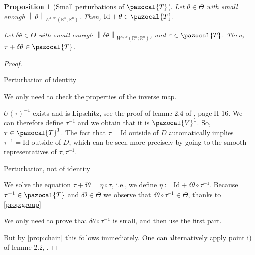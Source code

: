 \documentclass[english,a4paper,12pt,oneside]{scrbook}
\theoremstyle{break}
\newtheorem{prop}[equation]{Proposition}
\newenvironment{mproof}[1][\proofname]{%
  \begin{proof}[#1]$ $\par\nobreak\ignorespaces
}{%
  \end{proof}
}
\renewcommand*{\proofname}{Proof}
\theoremstyle{remark}
\newcommand{\mR}{\mathbb{R}}
\newcommand{\cV}{\pazocal{V}}
\newcommand{\norm}[1]{\left\lVert#1\right\rVert}
\newcommand{\cT}{\pazocal{T}}
\newcommand{\id}{\text{Id}}
\newcommand{\te}{\theta}
\newcommand{\Te}{\Theta}
\begin{document}
\begin{prop}[Small perturbations of $\cT$]
\label{prop:ptb_id}
Let $\te \in \Te$ with small enough $\norm{\te}_{W^{1,\infty}(\mR^n;\mR^n)}$. Then, $\id+\te\in \cT$.

Let $\delta \te \in \Te$ with small enough $\norm{\delta\te}_{W^{1,\infty}(\mR^n;\mR^n)}$, and $\tau \in \cT$. Then, $\tau + \delta \te\in \cT$.

\end{prop}
\begin{mproof}

\underline{Perturbation of identity}

We only need to check the properties of the inverse map.

$U(\tau)^{-1}$ exists and is Lipschitz, see the proof of lemme 2.4 of \cite{murat}, page II-16. We can therefore define $\tau^{-1}$ and we obtain that it is $\cV^1$. So, $\tau \in \cT^1$. The fact that $\tau = \id$ outside of $D$ automatically implies $\tau^{-1}=\id$ outside of $D$, which can be seen more precisely by going to the smooth representatives of $\tau, \tau^{-1}$.

%
%

\underline{Perturbation, not of identity}

We solve the equation $\tau + \delta \te =\eta \circ \tau$, i.e., we define $\eta:=\id + \delta \te \circ \tau^{-1}$. Because $\tau^{-1} \in \cT$ and $\delta \te \in \Te$ we observe that $\delta \te \circ \tau^{-1} \in \Te $, thanks to \cref{prop:group}.

We only need to prove that $\delta \te \circ \tau^{-1}$ is small, and then use the first part. 

But by \cref{prop:chain} this follows immediately. One can alternatively apply point i) of lemme 2.2, \cite{murat}.

\end{mproof}
\end{document}
